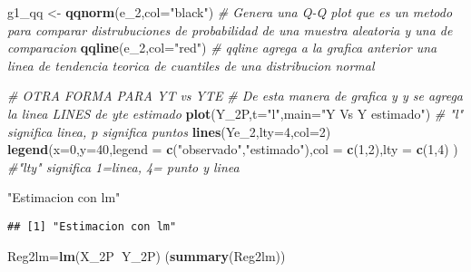 \documentclass[
]{article}
\newenvironment{Shaded}{\begin{snugshade}}{\end{snugshade}}
\newcommand{\CommentTok}[1]{\textcolor[rgb]{0.56,0.35,0.01}{\textit{#1}}}
\newcommand{\DataTypeTok}[1]{\textcolor[rgb]{0.13,0.29,0.53}{#1}}
\newcommand{\DecValTok}[1]{\textcolor[rgb]{0.00,0.00,0.81}{#1}}
\newcommand{\KeywordTok}[1]{\textcolor[rgb]{0.13,0.29,0.53}{\textbf{#1}}}
\newcommand{\NormalTok}[1]{#1}
\newcommand{\OperatorTok}[1]{\textcolor[rgb]{0.81,0.36,0.00}{\textbf{#1}}}
\newcommand{\StringTok}[1]{\textcolor[rgb]{0.31,0.60,0.02}{#1}}
\begin{document}
\begin{Shaded}
\begin{Highlighting}[]
\NormalTok{g1_qq <-}\StringTok{ }\KeywordTok{qqnorm}\NormalTok{(e_}\DecValTok{2}\NormalTok{,}\DataTypeTok{col=}\StringTok{"black"}\NormalTok{) }\CommentTok{# Genera una Q-Q plot que es un metodo para comparar distrubuciones de probabilidad de una muestra aleatoria y una de comparacion  }
\KeywordTok{qqline}\NormalTok{(e_}\DecValTok{2}\NormalTok{,}\DataTypeTok{col=}\StringTok{"red"}\NormalTok{) }\CommentTok{# qqline agrega a la grafica anterior una linea de tendencia teorica de cuantiles de una distribucion normal }

\CommentTok{# OTRA FORMA PARA YT vs YTE}
\CommentTok{# De esta manera de grafica y y se agrega la linea LINES de yte estimado }
\KeywordTok{plot}\NormalTok{(Y_2P,}\DataTypeTok{t=}\StringTok{"l"}\NormalTok{,}\DataTypeTok{main=}\StringTok{"Y Vs Y estimado"}\NormalTok{) }\CommentTok{#   "l" significa linea, p significa puntos}
\KeywordTok{lines}\NormalTok{(Ye_}\DecValTok{2}\NormalTok{,}\DataTypeTok{lty=}\DecValTok{4}\NormalTok{,}\DataTypeTok{col=}\DecValTok{2}\NormalTok{)}
\KeywordTok{legend}\NormalTok{(}\DataTypeTok{x=}\DecValTok{0}\NormalTok{,}\DataTypeTok{y=}\DecValTok{40}\NormalTok{,}\DataTypeTok{legend =} \KeywordTok{c}\NormalTok{(}\StringTok{"observado"}\NormalTok{,}\StringTok{"estimado"}\NormalTok{),}\DataTypeTok{col =} \KeywordTok{c}\NormalTok{(}\DecValTok{1}\NormalTok{,}\DecValTok{2}\NormalTok{),}\DataTypeTok{lty =} \KeywordTok{c}\NormalTok{(}\DecValTok{1}\NormalTok{,}\DecValTok{4}\NormalTok{) ) }\CommentTok{#"lty" significa 1=linea, 4= punto y linea }

\StringTok{"Estimacion con lm"}
\end{Highlighting}
\end{Shaded}

\begin{verbatim}
## [1] "Estimacion con lm"
\end{verbatim}

\begin{Shaded}
\begin{Highlighting}[]
\NormalTok{Reg2lm=}\KeywordTok{lm}\NormalTok{(X_2P}\OperatorTok{~}\NormalTok{Y_2P)}
\NormalTok{(}\KeywordTok{summary}\NormalTok{(Reg2lm))}
\end{Highlighting}
\end{Shaded}
\end{document}
